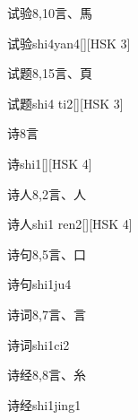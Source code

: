 \begin{entry}{试验}{8,10}{⾔、⾺}
  \begin{phonetics}{试验}{shi4yan4}[][HSK 3]
  \end{phonetics}
\end{entry}

\begin{entry}{试题}{8,15}{⾔、⾴}
  \begin{phonetics}{试题}{shi4 ti2}[][HSK 3]
  \end{phonetics}
\end{entry}

\begin{entry}{诗}{8}{⾔}
  \begin{phonetics}{诗}{shi1}[][HSK 4]
  \end{phonetics}
\end{entry}

\begin{entry}{诗人}{8,2}{⾔、⼈}
  \begin{phonetics}{诗人}{shi1 ren2}[][HSK 4]
  \end{phonetics}
\end{entry}

\begin{entry}{诗句}{8,5}{⾔、⼝}
  \begin{phonetics}{诗句}{shi1ju4}
  \end{phonetics}
\end{entry}

\begin{entry}{诗词}{8,7}{⾔、⾔}
  \begin{phonetics}{诗词}{shi1ci2}
  \end{phonetics}
\end{entry}

\begin{entry}{诗经}{8,8}{⾔、⽷}
  \begin{phonetics}{诗经}{shi1jing1}
  \end{phonetics}
\end{entry}

